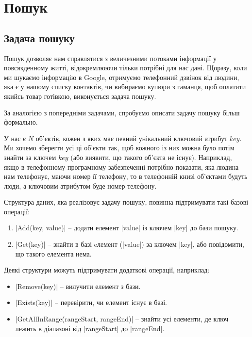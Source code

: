 \documentclass[12pt,a4paper]{report}
\begin{document}
\chapter{Пошук}

\begingroup
\let\clearpage\relax
\tableofcontents
\endgroup



\section{Задача пошуку}

Пошук дозволяє нам справлятися з величезними потоками інформації у повсякденному житті, відокремлюючи тільки потрібні для нас дані. Щоразу, коли ми шукаємо інформацію в Google, отримуємо телефонний дзвінок від людини, яка є у нашому списку контактів, чи вибираємо купюри з гаманця, щоб оплатити якийсь товар готівкою, виконується задача пошуку.

За аналогією з попередніми задачами, спробуємо описати задачу пошуку більш формально.

У нас є \(N\) об’єктів, кожен з яких має певний унікальний ключовий атрибут \(key\). Ми хочемо зберегти усі ці об’єкти так, щоб кожного із них можна було потім знайти за ключем \(key\) (або виявити, що такого об’єкта не існує). Наприклад, якщо в телефонному програмному забезпеченні потрібно показати, яка людина нам телефонує, маючи номер її телефону, то в телефонній книзі об’єктами будуть люди, а ключовим атрибутом буде номер телефону.

Структура даних, яка реалізовує задачу пошуку, повинна підтримувати такі базові операції:

\begin{enumerate}
    \item |Add(key, value)| -- додати елемент |value| із ключем |key| до бази пошуку.
    \item |Get(key)| -- знайти в базі eлемент (|value|) за ключем |key|, або повідомити, що такого елемента нема.
\end{enumerate}

Деякі структури можуть підтримувати додаткові операції, наприклад:
\begin{itemize}
    \item |Remove(key)| -- вилучити елемент з бази.
    \item |Exists(key)| -- перевірити, чи елемент існує в базі.
    \item |GetAllInRange(rangeStart, rangeEnd)| -- знайти усі елементи, де ключ лежить в діапазоні від |rangeStart| до |rangeEnd|.
\end{itemize}
\end{document}
